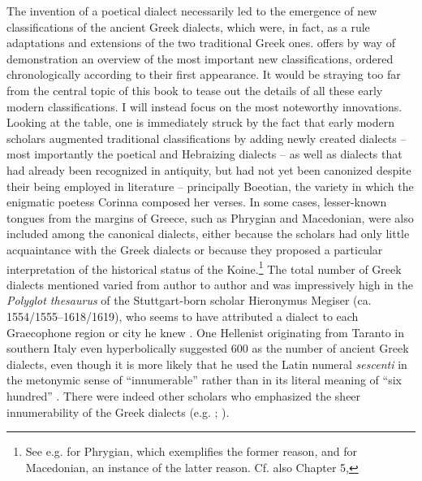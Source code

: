 {The invention of a poetical dialect necessarily led to the emergence of new classifications of the ancient Greek dialects, which were, in fact, as a rule adaptations and extensions of the two traditional Greek ones.  offers by way of demonstration an overview of the most important new classifications, ordered chronologically according to their first appearance. It would be straying too far from the central topic of this book to tease out the details of all these early modern classifications. I will instead focus on the most noteworthy innovations. Looking at the table, one is immediately struck by the fact that early modern scholars augmented traditional classifications by adding newly created dialects – most importantly the poetical and Hebraizing dialects – as well as dialects that had already been recognized in antiquity, but had not yet been canonized despite their being employed in literature – principally Boeotian, the variety in which the enigmatic poetess Corinna composed her verses. In some cases, lesser-known tongues from the margins of Greece, such as Phrygian and Macedonian, were also included among the canonical dialects, either because the scholars had only little acquaintance with the Greek dialects or because they proposed a particular interpretation of the historical status of the Koine.\footnote{See e.g. \citet[131]{Kircher1679} for Phrygian, which exemplifies the former reason, and \citet[\textsc{c.2}\textsc{\textsuperscript{v}}]{Schwartz1702} for Macedonian, an instance of the latter reason. Cf. also Chapter 5, } The total number of Greek dialects mentioned varied from author to author and was impressively high in the \textit{Polyglot thesaurus} of the Stuttgart-born scholar Hieronymus Megiser (ca. 1554/1555–1618/1619), who seems to have attributed a dialect to each Graecophone region or city he knew \citep[.7\textsc{\textsuperscript{r-v}}]{Megiser1603}. One Hellenist originating from Taranto in southern Italy even hyperbolically suggested 600 as the number of ancient Greek dialects, even though it is more likely that he used the Latin numeral \textit{sescenti} in the metonymic sense of “innumerable” rather than in its literal meaning of “six hundred” \citep[9]{Giovane1589}. There were indeed other scholars who emphasized the sheer innumerability of the Greek dialects (e.g. \citealt[127]{Bischoff1708}; \citealt[196]{Ries1786}).

}
